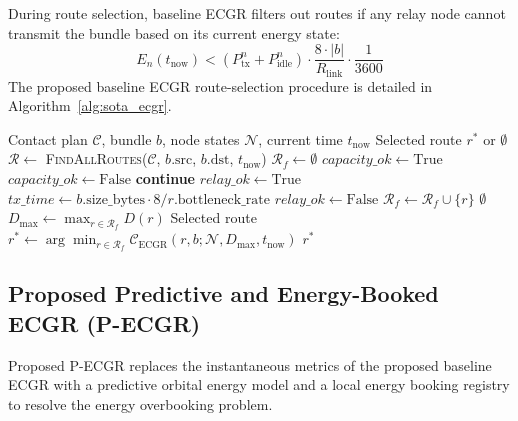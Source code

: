 \documentclass[a4paper,fleqn]{cas-dc}
\newcommand{\ecgr}{\textsf{ECGR}}
\newcommand{\pecgr}{\textsf{P-ECGR}}
\begin{document}
During route selection, baseline \ecgr{} filters out routes if any relay node cannot transmit the bundle based on its current energy state:
\begin{equation}
    E_n(t_{\text{now}}) < (P_{\text{tx}}^n + P_{\text{idle}}^n) \cdot \frac{8 \cdot |b|}{R_{\text{link}}} \cdot \frac{1}{3600}
\end{equation}
The proposed baseline \ecgr{} route-selection procedure is detailed in Algorithm~\ref{alg:sota_ecgr}.

\begin{algorithm}[h]
\caption{Proposed Baseline \ecgr{} Route Selection}
\label{alg:sota_ecgr}
\begin{algorithmic}[1]
\REQUIRE Contact plan $\mathcal{C}$, bundle $b$, node states $\mathcal{N}$, current time $t_{\text{now}}$
\ENSURE Selected route $r^*$ or $\emptyset$
\STATE $\mathcal{R} \leftarrow$ \textsc{FindAllRoutes}($\mathcal{C}$, $b.\text{src}$, $b.\text{dst}$, $t_{\text{now}}$)
\STATE $\mathcal{R}_f \leftarrow \emptyset$
    \STATE $capacity\_ok \leftarrow \text{True}$
            \STATE $capacity\_ok \leftarrow \text{False}$
        \ENDIF
    \ENDFOR
        \STATE \textbf{continue}
    \ENDIF
    \STATE $relay\_ok \leftarrow \text{True}$
        \STATE $tx\_time \leftarrow b.\text{size\_bytes} \cdot 8 / r.\text{bottleneck\_rate}$
            \STATE $relay\_ok \leftarrow \text{False}$
        \ENDIF
    \ENDFOR
        \STATE $\mathcal{R}_f \leftarrow \mathcal{R}_f \cup \{r\}$
    \ENDIF
\ENDFOR
{}
    \RETURN $\emptyset$
\ENDIF
\STATE $D_{\max} \leftarrow \max_{r \in \mathcal{R}_f} D(r)$
\STATE Selected route $r^* \leftarrow \arg\min_{r \in \mathcal{R}_f} \mathcal{C}_{\text{ECGR}}(r, b; \mathcal{N}, D_{\max}, t_{\text{now}})$
\RETURN $r^*$
\end{algorithmic}
\end{algorithm}

\subsection{Proposed Predictive and Energy-Booked ECGR (P-ECGR)}
Proposed \pecgr{} replaces the instantaneous metrics of the proposed baseline \ecgr{} with a predictive orbital energy model and a local energy booking registry to resolve the energy overbooking problem.
\end{document}
